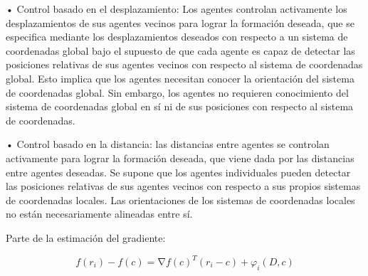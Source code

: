 • Control basado en el desplazamiento: Los agentes controlan activamente los desplazamientos de sus agentes vecinos para lograr la formación deseada, que se especifica mediante los desplazamientos deseados con respecto a un sistema de coordenadas global bajo el supuesto de que cada agente es capaz de detectar las posiciones relativas de sus agentes vecinos con respecto al sistema de coordenadas global. Esto implica que los agentes necesitan conocer la orientación del sistema de coordenadas global. Sin embargo, los agentes no requieren conocimiento del sistema de coordenadas global en sí ni de sus posiciones con respecto al sistema de coordenadas.

• Control basado en la distancia: las distancias entre agentes se controlan activamente para lograr la formación deseada, que viene dada por las distancias entre agentes deseadas. Se supone que los agentes individuales pueden detectar las posiciones relativas de sus agentes vecinos con respecto a sus propios sistemas de coordenadas locales. Las orientaciones de los sistemas de coordenadas locales no están necesariamente alineadas entre sí.

Parte de la estimación del gradiente:


\begin{equation*}
	f\left(r_{i}\right)-f\left(c\right)=\mathrm{\nabla}{f}\left(c\right)^{T}\left(r_{i}-c\right)+\varphi_{i}\left(D,c\right)
\end{equation*}
